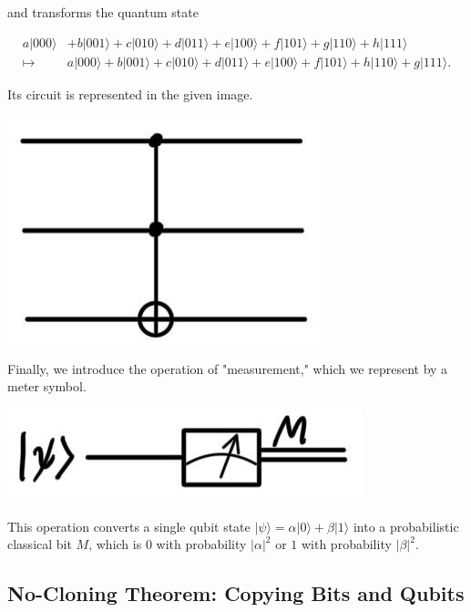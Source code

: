 \documentclass{article}
\theoremstyle{definition}
\begin{document}
\begin{enumerate}
      and transforms the quantum state

        \begin{align*}
          a|000\rangle & + b|001\rangle + c|010\rangle + d |011\rangle + e|100\rangle + f |101\rangle + g|110\rangle + h|111\rangle \\
          \mapsto & a|000\rangle + b|001\rangle + c|010\rangle + d |011\rangle + e|100\rangle + f |101\rangle + h|110\rangle + g|111\rangle.
        \end{align*}

        Its circuit is represented in the given image.

        \begin{center}
          \includegraphics[scale=0.3]{img/Toffoli_gate.jpg}
        \end{center}
    \end{enumerate}

    Finally, we introduce the operation of "measurement," which we represent by a meter symbol.

    \begin{center}
      \includegraphics[scale=0.3]{img/Measurement_gate.jpg}
    \end{center}

    This operation converts a single qubit state $| \psi \rangle = \alpha |0\rangle + \beta |1\rangle$ into a probabilistic classical bit $M$, which is $0$ with probability $|\alpha|^2$ or $1$ with probability $|\beta|^2$. 

  \subsection{No-Cloning Theorem: Copying Bits and Qubits}
\end{document}
